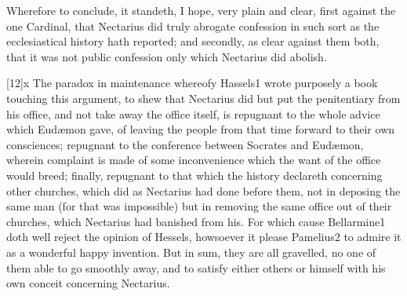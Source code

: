 Wherefore to conclude, it standeth, I hope, very plain and clear, first against the one Cardinal, that Nectarius did truly abrogate confession in such sort as the ecclesiastical history hath reported; and secondly, as clear against them both, that it was not public confession only which Nectarius did abolish.

[12]x The paradox in maintenance whereofy Hassels1 wrote purposely a book touching this argument, to shew that Nectarius did but put the penitentiary from his office, and not take away the office itself, is repugnant to the whole advice which Eudæmon gave, of leaving the people from that time forward to their own consciences; repugnant to the conference between Socrates and Eudæmon, wherein complaint is made of some inconvenience which the want of the office would breed; finally, repugnant to that which the history declareth concerning other churches, which did as Nectarius had done before them, not in deposing the same man (for that was impossible) but in removing the same office out of their churches, which Nectarius had banished from his. For which cause  Bellarmine1 doth well reject the opinion of Hessels, howsoever it please Pamelius2 to admire it as a wonderful happy invention. But in sum, they are all gravelled, no one of them able to go smoothly away, and to satisfy either others or himself with his own conceit concerning Nectarius.

